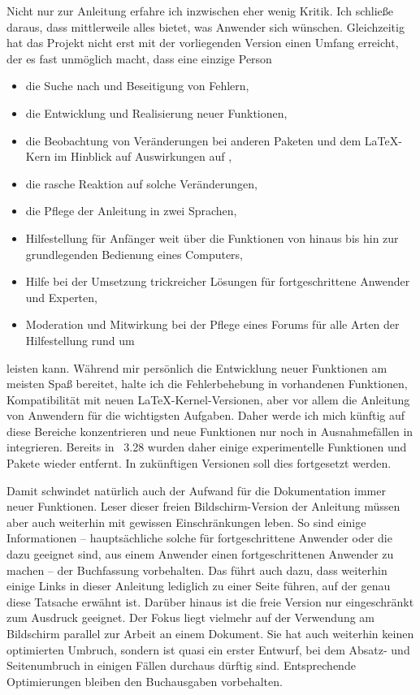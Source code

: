 Nicht nur zur Anleitung erfahre ich inzwischen eher wenig Kritik. Ich schließe
daraus, dass \KOMAScript{} mittlerweile alles bietet, was Anwender sich
wünschen. Gleichzeitig hat das Projekt nicht erst mit der vorliegenden Version
einen Umfang erreicht, der es fast unmöglich macht, dass eine einzige Person
\begin{itemize}
\item die Suche nach und Beseitigung von Fehlern,
\item die Entwicklung und Realisierung neuer Funktionen,
\item die Beobachtung von Veränderungen bei anderen Paketen und dem
  \LaTeX-Kern im Hinblick auf Auswirkungen auf \KOMAScript,
\item die rasche Reaktion auf solche Veränderungen,
\item die Pflege der Anleitung in zwei Sprachen,
\item Hilfestellung für Anfänger weit über die Funktionen von \KOMAScript{}
  hinaus bis hin zur grundlegenden Bedienung eines Computers,
\item Hilfe bei der Umsetzung trickreicher Lösungen für fortgeschrittene
  Anwender und Experten,
\item Moderation und Mitwirkung bei der Pflege eines Forums für alle Arten der
  Hilfestellung rund um \KOMAScript
\end{itemize}
leisten kann. Während mir persönlich die Entwicklung neuer Funktionen am
meisten Spaß bereitet, halte ich die Fehlerbehebung in vorhandenen Funktionen,
Kompatibilität mit neuen \LaTeX-Kernel-Versionen, aber vor allem die Anleitung
von Anwendern für die wichtigsten Aufgaben. Daher werde ich mich künftig auf
diese Bereiche konzentrieren und neue Funktionen nur noch in Ausnahmefällen in
\KOMAScript{} integrieren. Bereits in \KOMAScript~3.28 wurden daher einige
experimentelle Funktionen und Pakete wieder entfernt. In zukünftigen Versionen
soll dies fortgesetzt werden.

Damit schwindet natürlich auch der Aufwand für die Dokumentation immer neuer
Funktionen. Leser dieser freien Bildschirm-Version der Anleitung müssen aber
auch weiterhin mit gewissen Einschränkungen leben. So sind einige
Informationen -- hauptsächliche solche für fortgeschrittene Anwender oder die
dazu geeignet sind, aus einem Anwender einen fortgeschrittenen Anwender zu
machen -- der Buchfassung vorbehalten. Das führt auch dazu, dass weiterhin
einige Links in dieser Anleitung lediglich zu einer Seite führen, auf der
genau diese Tatsache erwähnt ist. Darüber hinaus ist die freie Version nur
eingeschränkt zum Ausdruck geeignet. Der Fokus liegt vielmehr auf der
Verwendung am Bildschirm parallel zur Arbeit an einem Dokument. Sie hat auch
weiterhin keinen optimierten Umbruch, sondern ist quasi ein erster Entwurf,
bei dem Absatz- und Seitenumbruch in einigen Fällen durchaus dürftig
sind. Entsprechende Optimierungen bleiben den Buchausgaben vorbehalten.

